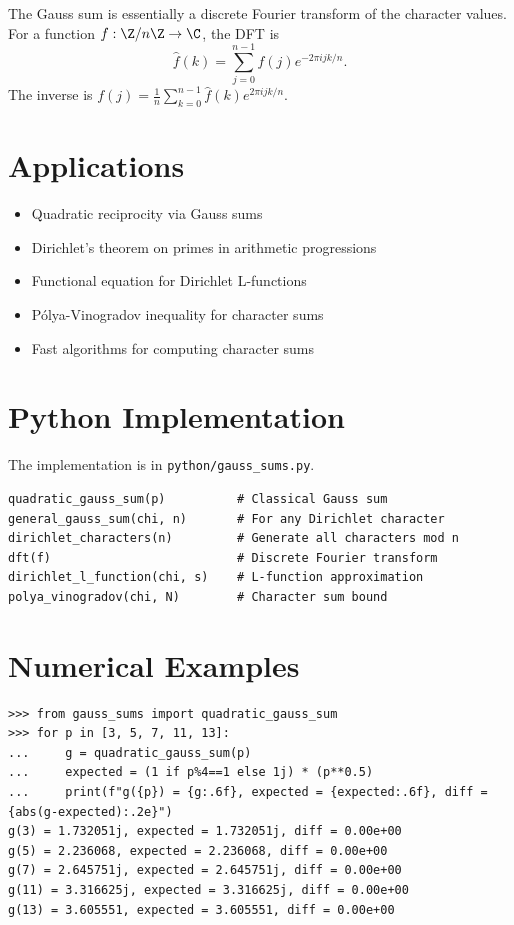 The Gauss sum is essentially a discrete Fourier transform of the character values. For a function $f: \Z/n\Z \to \C$, the DFT is
\[
\hat{f}(k) = \sum_{j=0}^{n-1} f(j) e^{-2\pi i jk/n}.
\]
The inverse is $f(j) = \frac{1}{n} \sum_{k=0}^{n-1} \hat{f}(k) e^{2\pi i jk/n}$.

\section{Applications}

\begin{itemize}
    \item Quadratic reciprocity via Gauss sums
    \item Dirichlet's theorem  on primes in arithmetic progressions
    \item Functional equation for Dirichlet L-functions
    \item Pólya-Vinogradov  inequality for character sums
    \item Fast algorithms for computing character sums
\end{itemize}

\section{Python Implementation}
\label{sec:gauss-sums-python}

The implementation is in \texttt{python/gauss\_sums.py}.

\begin{lstlisting}[style=python, caption={Key functions in python/gauss\_sums.py}]
quadratic_gauss_sum(p)          # Classical Gauss sum
general_gauss_sum(chi, n)       # For any Dirichlet character
dirichlet_characters(n)         # Generate all characters mod n
dft(f)                          # Discrete Fourier transform
dirichlet_l_function(chi, s)    # L-function approximation
polya_vinogradov(chi, N)        # Character sum bound
\end{lstlisting}

\section{Numerical Examples}

\begin{example}
\begin{lstlisting}[style=python]
>>> from gauss_sums import quadratic_gauss_sum
>>> for p in [3, 5, 7, 11, 13]:
...     g = quadratic_gauss_sum(p)
...     expected = (1 if p%4==1 else 1j) * (p**0.5)
...     print(f"g({p}) = {g:.6f}, expected = {expected:.6f}, diff = {abs(g-expected):.2e}")
g(3) = 1.732051j, expected = 1.732051j, diff = 0.00e+00
g(5) = 2.236068, expected = 2.236068, diff = 0.00e+00
g(7) = 2.645751j, expected = 2.645751j, diff = 0.00e+00
g(11) = 3.316625j, expected = 3.316625j, diff = 0.00e+00
g(13) = 3.605551, expected = 3.605551, diff = 0.00e+00
\end{lstlisting}
\end{example}

